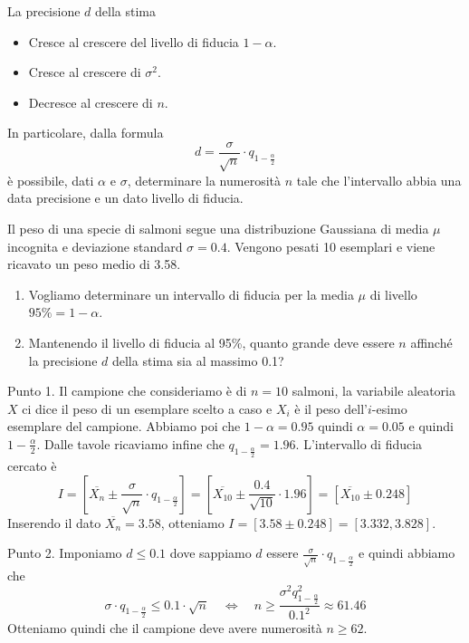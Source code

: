 \begin{observation}
	La precisione $d$ della stima
	\begin{itemize}
		\item Cresce al crescere del livello di fiducia $1-\alpha$.
		\item Cresce al crescere di $\sigma^2$.
		\item Decresce al crescere di $n$.
	\end{itemize}
	In particolare, dalla formula
	\[ d = \frac{\sigma}{\sqrt{n}} \cdot q_{1 - \frac{\alpha}{2}} \]
	è possibile, dati $\alpha$ e $\sigma$, determinare la numerosità $n$ tale che l'intervallo
	abbia una data precisione e un dato livello di fiducia.
\end{observation}

\begin{example}
	Il peso di una specie di salmoni segue una distribuzione Gaussiana di media $\mu$ incognita e
	deviazione standard $\sigma = 0.4$. Vengono pesati 10 esemplari e viene ricavato un peso medio
	di 3.58.
	\begin{enumerate}
		\item Vogliamo determinare un intervallo di fiducia per la media $\mu$ di livello
		      $95\% = 1 - \alpha$.
		\item Mantenendo il livello di fiducia al 95\%, quanto grande deve essere $n$ affinché la
		      precisione $d$ della stima sia al massimo 0.1?
	\end{enumerate}

	Punto 1. Il campione che consideriamo è di $n=10$ salmoni, la variabile aleatoria $X$ ci dice
	il peso di un esemplare scelto a caso e $X_i$ è il peso dell'$i$-esimo esemplare del campione.
	Abbiamo poi che $1-\alpha = 0.95$ quindi $\alpha=0.05$ e quindi $1 - \frac{\alpha}{2}$. Dalle
	tavole ricaviamo infine che $q_{1-\frac{\alpha}{2}} = 1.96$. L'intervallo di fiducia cercato è
	\[
		I = \left[ \overline{X_n} \pm \frac{\sigma}{\sqrt{n}} \cdot q_{1-\frac{\alpha}{2}} \right]
		= \left[ \overline{X_{10}} \pm \frac{0.4}{\sqrt{10}} \cdot 1.96 \right]
		= \left[ \overline{X_{10}} \pm 0.248 \right]
	\]
	Inserendo il dato $\overline{X_n} = 3.58$, otteniamo $I = [3.58 \pm 0.248] = [3.332, 3.828]$.

	Punto 2. Imponiamo $d \leq 0.1$ dove sappiamo $d$ essere
	$\frac{\sigma}{\sqrt{n}} \cdot q_{1-\frac{\alpha}{2}}$ e quindi abbiamo che
	\[
		\sigma \cdot q_{1-\frac{\alpha}{2}} \leq 0.1 \cdot \sqrt{n}
		\quad \Leftrightarrow \quad
		n \geq \frac{\sigma^2 q_{1-\frac{\alpha}{2}}^2}{0.1^2} \approx 61.46
	\]
	Otteniamo quindi che il campione deve avere numerosità $n \geq 62$.
\end{example}


